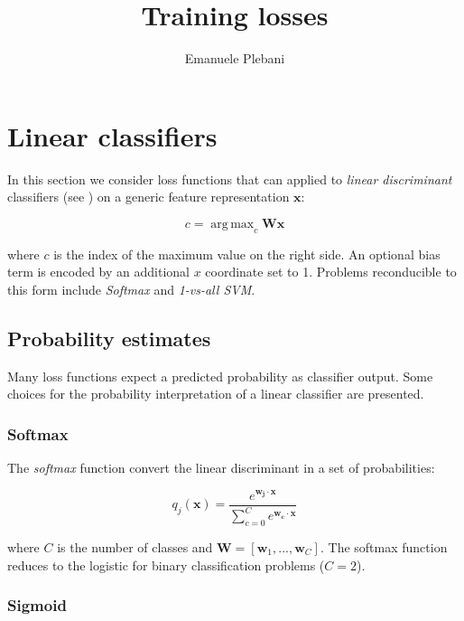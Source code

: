 \documentclass{article}
\title{Training losses}
\author{Emanuele Plebani}
\DeclareMathOperator*{\argmax}{arg\,max}
\begin{document}
\maketitle

\section{Linear classifiers}

In this section we consider loss functions that can applied to \emph{linear
discriminant} classifiers (see \cite{Gupta2014}) on a generic feature
representation $\mathbf{x}$:

\begin{equation*}
c = \argmax_c \mathbf{W}\mathbf{x}
\end{equation*}

where $c$ is the index of the maximum value on the right side. An optional bias
term is encoded by an additional $x$ coordinate set to 1. Problems reconducible
to this form include \emph{Softmax} and \emph{1-vs-all SVM}.


\subsection{Probability estimates}

Many loss functions expect a predicted probability as classifier output. Some
choices for the probability interpretation of a linear classifier are presented.


\subsubsection{Softmax}

The \emph{softmax} function convert the linear discriminant in a set of
probabilities:

\begin{equation*}
q_j(\mathbf{x}) = \frac{e^{\mathbf{w_j} \cdot \mathbf{x}}}
  {\sum_{c=0}^{C} e^{\mathbf{w_c} \cdot \mathbf{x}}}
\end{equation*}

where $C$ is the number of classes and $\mathbf{W} = \left[ \mathbf{w}_1, ...,
\mathbf{w}_C \right]$. The softmax function reduces to the logistic for binary
classification problems ($C = 2$).


\subsubsection{Sigmoid}
\end{document}
